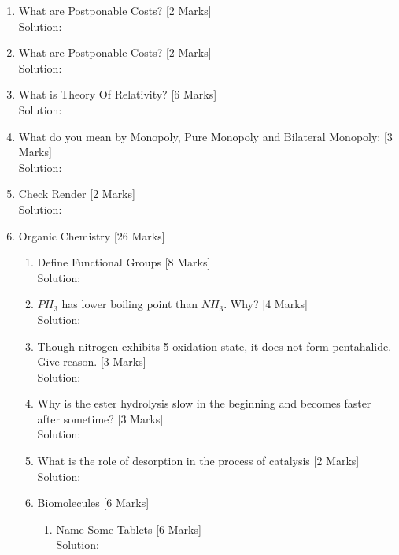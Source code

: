 \documentclass[10pt]{article}
\begin{document}
\pagebreak\begin{enumerate}\item What are Postponable Costs?\hfill
[2 Marks]
\\Solution:\\ \vspace*{30pt}\item What are Postponable Costs?\hfill
[2 Marks]
\\Solution:\\ \vspace*{30pt}\item What is Theory Of Relativity?\hfill
[6 Marks]
\\Solution:\\ \vspace*{90pt}\item What do you mean by Monopoly, Pure Monopoly and Bilateral Monopoly:\hfill
[3 Marks]
\\Solution:\\ \vspace*{45pt}\item Check Render\hfill
[2 Marks]
\\Solution:\\ \vspace*{30pt}\item Organic Chemistry\hfill
[26 Marks]
\begin{enumerate}\item Define Functional Groups\hfill
[8 Marks]
\\Solution:\\ \vspace*{120pt}\item $PH_3$ has lower boiling point than $NH_3$. Why?\hfill
[4 Marks]
\\Solution:\\ \vspace*{60pt}\item Though nitrogen exhibits 5 oxidation state, it does not form pentahalide. Give reason.\hfill
[3 Marks]
\\Solution:\\ \vspace*{45pt}\item Why is the ester hydrolysis slow in the beginning and becomes faster after sometime?\hfill
[3 Marks]
\\Solution:\\ \vspace*{45pt}\item What is the role of desorption in the process of catalysis\hfill
[2 Marks]
\\Solution:\\ \vspace*{30pt}\item Biomolecules\hfill
[6 Marks]
\begin{enumerate}\item Name Some Tablets\hfill
[6 Marks]
\\Solution:\\ \vspace*{90pt}\end{enumerate}
\end{enumerate}
\end{enumerate}
\end{document}
